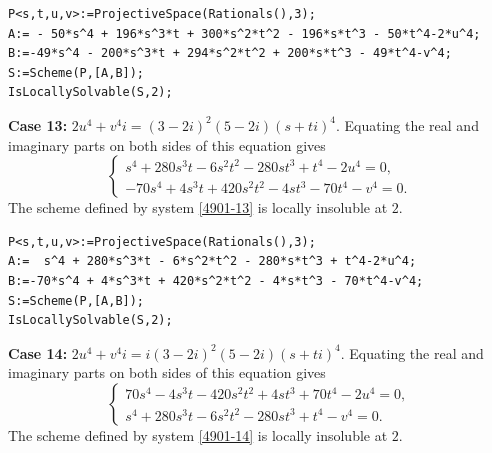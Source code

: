 \documentclass[a4paper,12pt,english,reqno]{amsart}
\begin{document}
\begin{lstlisting}
P<s,t,u,v>:=ProjectiveSpace(Rationals(),3);
A:= - 50*s^4 + 196*s^3*t + 300*s^2*t^2 - 196*s*t^3 - 50*t^4-2*u^4;
B:=-49*s^4 - 200*s^3*t + 294*s^2*t^2 + 200*s*t^3 - 49*t^4-v^4;
S:=Scheme(P,[A,B]);
IsLocallySolvable(S,2);
\end{lstlisting}


{\bf Case 13:} $2u^4+v^4i=(3- 2i)^2(5-2i)(s+ti)^4$.  Equating the real and imaginary parts on both sides of this equation gives
\begin{equation}\label{4901-13}
\begin{cases}
s^4 + 280s^3t - 6s^2t^2 - 280st^3 + t^4 - 2u^4=0,\\
-70s^4 + 4s^3t + 420s^2t^2 - 4st^3 - 70t^4 - v^4=0.
\end{cases}
\end{equation}
The scheme defined by system \eqref{4901-13} is locally insoluble at $2$.

\begin{lstlisting}
P<s,t,u,v>:=ProjectiveSpace(Rationals(),3);
A:=  s^4 + 280*s^3*t - 6*s^2*t^2 - 280*s*t^3 + t^4-2*u^4;
B:=-70*s^4 + 4*s^3*t + 420*s^2*t^2 - 4*s*t^3 - 70*t^4-v^4;
S:=Scheme(P,[A,B]);
IsLocallySolvable(S,2);
\end{lstlisting}

{\bf Case 14:} $2u^4+v^4i=i(3- 2i)^2(5-2i)(s+ti)^4$.  Equating the real and imaginary parts on both sides of this equation gives
\begin{equation}\label{4901-14}
\begin{cases}
70s^4 - 4s^3t - 420s^2t^2 + 4st^3 + 70t^4 - 2u^4=0,\\
s^4 + 280s^3t - 6s^2t^2 - 280st^3 + t^4 - v^4=0.
\end{cases}
\end{equation}
The scheme defined by system \eqref{4901-14} is locally insoluble at $2$.
\end{document}
